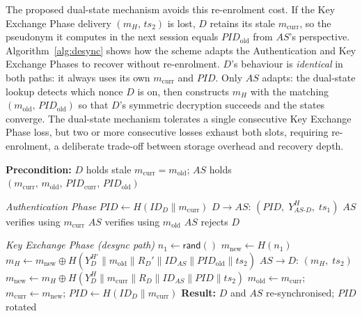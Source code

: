 \documentclass[conference]{IEEEtran}
\begin{document}
The proposed dual-state mechanism avoids this re-enrolment cost.  If the Key
Exchange Phase delivery $(m_H,\,ts_2)$ is lost, $D$ retains its stale
$m_{\mathrm{curr}}$, so the pseudonym it computes in the next session equals
$\mathit{PID}_{\mathrm{old}}$ from $AS$'s perspective.  Algorithm~\ref{alg:desync}
shows how the scheme adapts the Authentication and Key Exchange Phases to recover without re-enrolment.
$D$'s behaviour is \emph{identical} in both paths: it always uses its own
$m_{\mathrm{curr}}$ and $\mathit{PID}$.  Only $AS$ adapts: the dual-state
lookup detects which nonce $D$ is on, then constructs $m_H$ with the matching
$(m_{\mathrm{old}},\,\mathit{PID}_{\mathrm{old}})$ so that $D$'s symmetric
decryption succeeds and the states converge.
The dual-state mechanism tolerates a single consecutive Key Exchange Phase loss, but
two or more consecutive losses exhaust both slots, requiring re-enrolment, a
deliberate trade-off between storage overhead and recovery depth.

\begin{algorithm}[t]
\caption{Desynchronisation Recovery}
\label{alg:desync}
\begin{algorithmic}[1]
\Statex \textbf{Precondition:} $D$ holds stale $m_{\mathrm{curr}}\!=\!m_{\mathrm{old}}$;\;
       $AS$ holds $(m_{\mathrm{curr}},\,m_{\mathrm{old}},\,
       \mathit{PID}_{\mathrm{curr}},\,\mathit{PID}_{\mathrm{old}})$

\Statex
\Statex \textit{Authentication Phase}
\State $\mathit{PID} \gets H(\mathit{ID}_D \| m_{\mathrm{curr}})$
       \hfill{}
\State $D \to AS$: $(\mathit{PID},\; Y_{AS\text{-}D}^H,\; ts_1)$
    \State $AS$ verifies using $m_{\mathrm{curr}}$ \hfill{}
    \State $AS$ verifies using $m_{\mathrm{old}}$ \hfill{}
\Else
    \State $AS$ rejects $D$
\EndIf

\Statex
\Statex \textit{Key Exchange Phase (desync path)}
\State $n_1 \gets \mathsf{rand}()$
\State $m_{\mathrm{new}} \gets H(n_1)$
\State $m_H \gets m_{\mathrm{new}} \oplus
       H\!\left(Y_D^{H'} \| m_{\mathrm{old}} \| R_D' \|
       \mathit{ID}_{AS} \| \mathit{PID}_{\mathrm{old}} \| ts_2\right)$
       \hfill{}
\State $AS \to D$: $(m_H,\; ts_2)$
\State $m_{\mathrm{new}} \gets m_H \oplus
       H\!\left(Y_D^{H} \| m_{\mathrm{curr}} \| R_D \|
       \mathit{ID}_{AS} \| \mathit{PID} \| ts_2\right)$
       \hfill{}
\State $m_{\mathrm{old}} \gets m_{\mathrm{curr}}$;\quad
       $m_{\mathrm{curr}} \gets m_{\mathrm{new}}$;\quad
       $\mathit{PID} \gets H(\mathit{ID}_D \| m_{\mathrm{curr}})$
\Statex \textbf{Result:} $D$ and $AS$ re-synchronised; $\mathit{PID}$ rotated
\end{algorithmic}
\end{algorithm}
\end{document}
